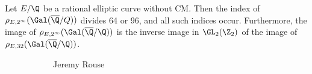 \begin{frame}[plain]
\begin{thm}
Let $E/\Q$ be a rational elliptic curve without CM. Then the index of $\rho_{E,2^\infty}(\Gal(\overline{\Q}/Q))$ divides 64 or 96, and all such indices occur. Furthermore, the image of $\rho_{E,2^\infty}(\Gal(\overline{\Q}/\Q))$ is the inverse image in $\GL_2(\Z_2)$ of the image of $\rho_{E,32}(\Gal(\overline{\Q}/\Q))$.
\end{thm}
	\begin{figure}[h]
	\centering
	\begin{subfigure}{0.3\textwidth}
	\captionsetup{labelformat=empty}
	\centering
	\caption{Jeremy Rouse}
	\end{subfigure}
	\begin{subfigure}{0.3\textwidth}
	\captionsetup{labelformat=empty}
	\centering

\end{subfigure}
\end{figure}
\end{frame}
